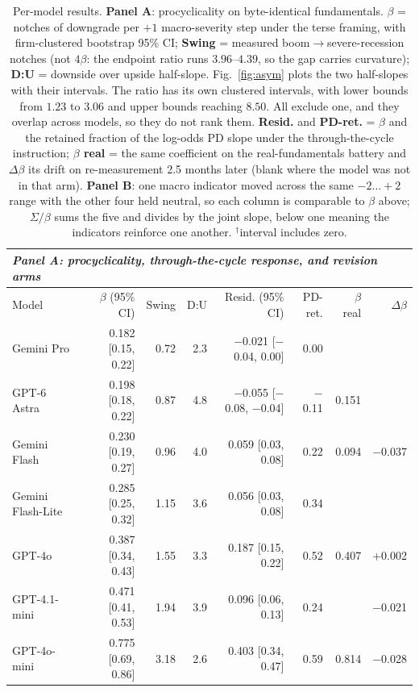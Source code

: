 \begin{table}[t]\centering\small
\caption{Per-model results. \textbf{Panel A}: procyclicality on byte-identical fundamentals. $\beta$ = notches of downgrade per $+1$ macro-severity step under the terse framing, with firm-clustered bootstrap 95\% CI; \textbf{Swing} = measured boom$\to$severe-recession notches (not $4\beta$: the endpoint ratio runs $3.96$--$4.39$, so the gap carries curvature); \textbf{D:U} = downside over upside half-slope. Fig.~\ref{fig:asym} plots the two half-slopes with their intervals. The ratio has its own clustered intervals, with lower bounds from $1.23$ to $3.06$ and upper bounds reaching $8.50$. All exclude one, and they overlap across models, so they do not rank them. \textbf{Resid.} and \textbf{PD-ret.} = $\beta$ and the retained fraction of the log-odds PD slope under the through-the-cycle instruction; \textbf{$\beta$ real} = the same coefficient on the real-fundamentals battery and \textbf{$\Delta\beta$} its drift on re-measurement 2.5 months later (blank where the model was not in that arm). \textbf{Panel B}: one macro indicator moved across the same $-2\ldots+2$ range with the other four held neutral, so each column is comparable to $\beta$ above; $\Sigma/\beta$ sums the five and divides by the joint slope, below one meaning the indicators reinforce one another. $^{\dagger}$interval includes zero.}
\label{tab:permodel}
\begin{tabular}{lrrrrrrr}
\toprule
\multicolumn{8}{l}{\emph{Panel A: procyclicality, through-the-cycle response, and revision arms}}\\
\midrule
Model & $\beta$ (95\% CI) & Swing & D:U & Resid. (95\% CI) & PD-ret. & $\beta$ real & $\Delta\beta$ \\
\midrule
Gemini Pro & 0.182 [0.15, 0.22] & 0.72 & 2.3 & $-$0.021 [$-$0.04, 0.00] & 0.00 &  &  \\
GPT-6 Astra & 0.198 [0.18, 0.22] & 0.87 & 4.8 & $-$0.055 [$-$0.08, $-$0.04] & $-$0.11 & 0.151 &  \\
Gemini Flash & 0.230 [0.19, 0.27] & 0.96 & 4.0 & 0.059 [0.03, 0.08] & 0.22 & 0.094 & $-$0.037 \\
Gemini Flash-Lite & 0.285 [0.25, 0.32] & 1.15 & 3.6 & 0.056 [0.03, 0.08] & 0.34 &  &  \\
GPT-4o & 0.387 [0.34, 0.43] & 1.55 & 3.3 & 0.187 [0.15, 0.22] & 0.52 & 0.407 & +0.002 \\
GPT-4.1-mini & 0.471 [0.41, 0.53] & 1.94 & 3.9 & 0.096 [0.06, 0.13] & 0.24 &  & $-$0.021 \\
GPT-4o-mini & 0.775 [0.69, 0.86] & 3.18 & 2.6 & 0.403 [0.34, 0.47] & 0.59 & 0.814 & $-$0.028 \\

\end{tabular}
\end{table}
